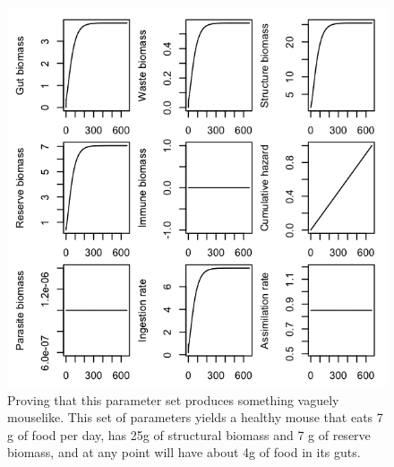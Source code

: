 \documentclass[12pt,reqno,final,pdftex]{amsart}\usepackage[]{graphicx}\usepackage[]{color}
\newenvironment{knitrout}{}{} %
\theoremstyle{plain}
\numberwithin{equation}{part}
\begin{document}
\begin{knitrout}
\begin{figure}
\includegraphics[width=\linewidth]{figure/unnamed-chunk-2-1} \hfill{}

\caption[Proving that this parameter set produces something vaguely mouselike]{Proving that this parameter set produces something vaguely mouselike. This set of parameters yields a healthy mouse that eats 7 g of food per day, has 25g of structural biomass and 7 g of reserve biomass, and at any point will have about 4g of food in its guts.\label{fig:unnamed-chunk-2}}
\end{figure}


\end{knitrout}
\end{document}
